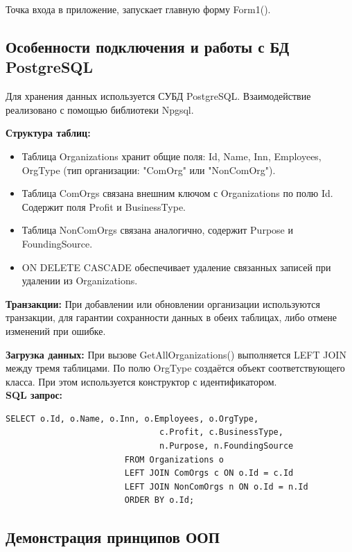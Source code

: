 \documentclass[oneside,a4paper,14pt]{extarticle}
\begin{document}
Точка входа в приложение, запускает главную форму Form1().

\newpage

\subsection*{Особенности подключения и работы с БД PostgreSQL}

Для хранения данных используется СУБД PostgreSQL. Взаимодействие реализовано с помощью библиотеки Npgsql.

\textbf{Структура таблиц:}
\begin{itemize}
    \item Таблица Organizations хранит общие поля: Id, Name, Inn, Employees, OrgType (тип организации: "ComOrg" или "NonComOrg").
    \item Таблица ComOrgs связана внешним ключом с Organizations по полю Id. Содержит поля Profit и BusinessType.
    \item Таблица NonComOrgs связана аналогично, содержит Purpose и FoundingSource.
    \item ON DELETE CASCADE обеспечивает удаление связанных записей при удалении из Organizations.
\end{itemize}

\textbf{Транзакции:}
При добавлении или обновлении организации используются транзакции, для гарантии сохранности данных в обеих таблицах, либо отмене изменений при ошибке.

\textbf{Загрузка данных:}
При вызове GetAllOrganizations() выполняется LEFT JOIN между тремя таблицами. По полю OrgType создаётся объект соответствующего класса. При этом используется конструктор с идентификатором.\\
\textbf{SQL запрос:}
\begin{lstlisting}
SELECT o.Id, o.Name, o.Inn, o.Employees, o.OrgType,
                               c.Profit, c.BusinessType,
                               n.Purpose, n.FoundingSource
                        FROM Organizations o
                        LEFT JOIN ComOrgs c ON o.Id = c.Id
                        LEFT JOIN NonComOrgs n ON o.Id = n.Id
                        ORDER BY o.Id;
\end{lstlisting}
\newpage

\subsection*{Демонстрация принципов ООП}
\end{document}
